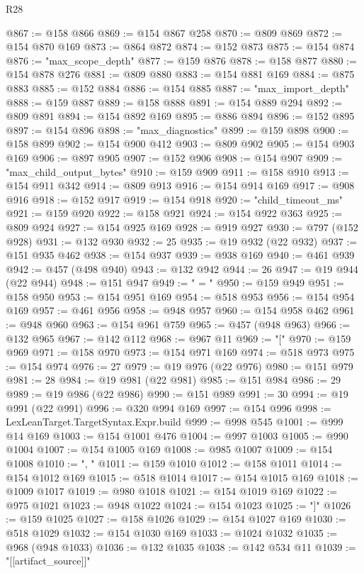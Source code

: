 \begin{lexlean}{R28}
\begin{coremodule}
@867 := @158 @866
@869 := @154 @867 @258
@870 := @809 @869
@872 := @154 @870 @169
@873 := @864 @872
@874 := @152 @873
@875 := @154 @874
@876 := "max_scope_depth"
@877 := @159 @876
@878 := @158 @877
@880 := @154 @878 @276
@881 := @809 @880
@883 := @154 @881 @169
@884 := @875 @883
@885 := @152 @884
@886 := @154 @885
@887 := "max_import_depth"
@888 := @159 @887
@889 := @158 @888
@891 := @154 @889 @294
@892 := @809 @891
@894 := @154 @892 @169
@895 := @886 @894
@896 := @152 @895
@897 := @154 @896
@898 := "max_diagnostics"
@899 := @159 @898
@900 := @158 @899
@902 := @154 @900 @412
@903 := @809 @902
@905 := @154 @903 @169
@906 := @897 @905
@907 := @152 @906
@908 := @154 @907
@909 := "max_child_output_bytes"
@910 := @159 @909
@911 := @158 @910
@913 := @154 @911 @342
@914 := @809 @913
@916 := @154 @914 @169
@917 := @908 @916
@918 := @152 @917
@919 := @154 @918
@920 := "child_timeout_ms"
@921 := @159 @920
@922 := @158 @921
@924 := @154 @922 @363
@925 := @809 @924
@927 := @154 @925 @169
@928 := @919 @927
@930 := @797 (@152 @928)
@931 := @132 @930
@932 := 25
@935 := @19 @932 (@22 @932)
@937 := @151 @935 @462
@938 := @154 @937
@939 := @938 @169
@940 := @461 @939
@942 := @457 (@498 @940)
@943 := @132 @942
@944 := 26
@947 := @19 @944 (@22 @944)
@948 := @151 @947
@949 := " = "
@950 := @159 @949
@951 := @158 @950
@953 := @154 @951 @169
@954 := @518 @953
@956 := @154 @954 @169
@957 := @461 @956
@958 := @948 @957
@960 := @154 @958 @462
@961 := @948 @960
@963 := @154 @961 @759
@965 := @457 (@948 @963)
@966 := @132 @965
@967 := @142 @112
@968 := @967 @11
@969 := "["
@970 := @159 @969
@971 := @158 @970
@973 := @154 @971 @169
@974 := @518 @973
@975 := @154 @974
@976 := 27
@979 := @19 @976 (@22 @976)
@980 := @151 @979
@981 := 28
@984 := @19 @981 (@22 @981)
@985 := @151 @984
@986 := 29
@989 := @19 @986 (@22 @986)
@990 := @151 @989
@991 := 30
@994 := @19 @991 (@22 @991)
@996 := @320 @994 @169
@997 := @154 @996
@998 := LexLeanTarget.TargetSyntax.Expr.build
@999 := @998 @545
@1001 := @999 @14 @169
@1003 := @154 @1001 @476
@1004 := @997 @1003
@1005 := @990 @1004
@1007 := @154 @1005 @169
@1008 := @985 @1007
@1009 := @154 @1008
@1010 := ", "
@1011 := @159 @1010
@1012 := @158 @1011
@1014 := @154 @1012 @169
@1015 := @518 @1014
@1017 := @154 @1015 @169
@1018 := @1009 @1017
@1019 := @980 @1018
@1021 := @154 @1019 @169
@1022 := @975 @1021
@1023 := @948 @1022
@1024 := @154 @1023
@1025 := "]"
@1026 := @159 @1025
@1027 := @158 @1026
@1029 := @154 @1027 @169
@1030 := @518 @1029
@1032 := @154 @1030 @169
@1033 := @1024 @1032
@1035 := @968 (@948 @1033)
@1036 := @132 @1035
@1038 := @142 @534 @11
@1039 := "[[artifact_source]]"

\end{coremodule}
\end{lexlean}
